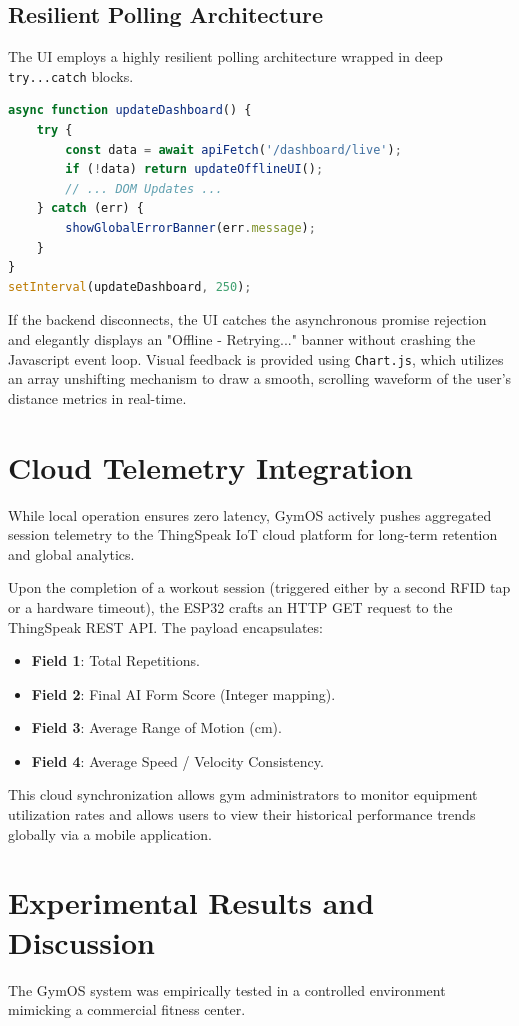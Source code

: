 \documentclass[conference]{IEEEtran}
\begin{document}
\subsection{Resilient Polling Architecture}
The UI employs a highly resilient polling architecture wrapped in deep \texttt{try...catch} blocks. 
\begin{lstlisting}[language=JavaScript]
async function updateDashboard() {
    try {
        const data = await apiFetch('/dashboard/live');
        if (!data) return updateOfflineUI();
        // ... DOM Updates ...
    } catch (err) {
        showGlobalErrorBanner(err.message);
    }
}
setInterval(updateDashboard, 250);
\end{lstlisting}
If the backend disconnects, the UI catches the asynchronous promise rejection and elegantly displays an "Offline - Retrying..." banner without crashing the Javascript event loop. Visual feedback is provided using \texttt{Chart.js}, which utilizes an array unshifting mechanism to draw a smooth, scrolling waveform of the user's distance metrics in real-time.

\section{Cloud Telemetry Integration}
While local operation ensures zero latency, GymOS actively pushes aggregated session telemetry to the ThingSpeak IoT cloud platform for long-term retention and global analytics.

Upon the completion of a workout session (triggered either by a second RFID tap or a hardware timeout), the ESP32 crafts an HTTP GET request to the ThingSpeak REST API. The payload encapsulates:
\begin{itemize}
    \item \textbf{Field 1}: Total Repetitions.
    \item \textbf{Field 2}: Final AI Form Score (Integer mapping).
    \item \textbf{Field 3}: Average Range of Motion (cm).
    \item \textbf{Field 4}: Average Speed / Velocity Consistency.
\end{itemize}
This cloud synchronization allows gym administrators to monitor equipment utilization rates and allows users to view their historical performance trends globally via a mobile application.

\section{Experimental Results and Discussion}
The GymOS system was empirically tested in a controlled environment mimicking a commercial fitness center.
\end{document}
